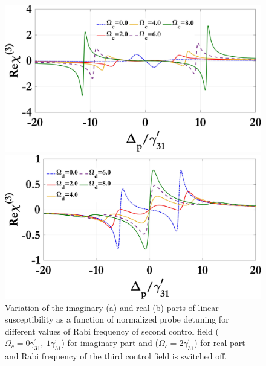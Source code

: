 \documentclass[12pt,a4paper]{article}
\begin{document}
\begin{figure}[h]
  \centering
  \begin{minipage}{0.48\textwidth}
    \centering
    \includegraphics[width=\linewidth]{Plots/Real_chi3_Omega_c.jpeg}
    \subcaption{}
  \end{minipage}%
  \hfill
  \begin{minipage}{0.48\textwidth}
    \centering
    \includegraphics[width=\linewidth]{Plots/Real_chi3_Omega_d.jpeg}
    \subcaption{}
  \end{minipage}
  \caption{Variation of the imaginary (a) and real (b) parts of linear susceptibility as a function of normalized probe detuning for different values of Rabi frequency of second control field ($\Omega_c=0\gamma^{\prime}_{31},\ 1\gamma^{\prime}_{31}$) for imaginary part and ($\Omega_c=2\gamma^{\prime}_{31}$) for real part and Rabi frequency of the third control field is switched off.}
  \label{fig:omegac}
\end{figure}
\end{document}
